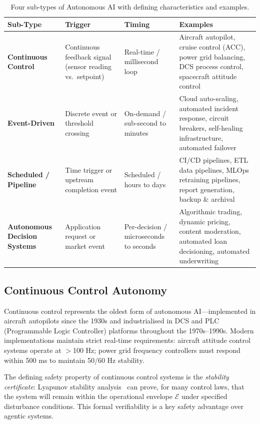 \documentclass[12pt, a4paper]{article}
\begin{document}
\begin{table}[ht]
\centering
\caption{Four sub-types of Autonomous AI with defining characteristics and examples.}
\label{tab:subtypes}
\begin{tabular}{lp{4cm}p{3.5cm}p{4cm}}
\toprule
\textbf{Sub-Type} & \textbf{Trigger} & \textbf{Timing} & \textbf{Examples} \\
\midrule
\textbf{Continuous Control}
  & Continuous feedback signal (sensor reading vs.\ setpoint)
  & Real-time / millisecond loop
  & Aircraft autopilot, cruise control (ACC), power grid balancing, DCS process control, spacecraft attitude control \\
\addlinespace
\textbf{Event-Driven}
  & Discrete event or threshold crossing
  & On-demand / sub-second to minutes
  & Cloud auto-scaling, automated incident response, circuit breakers, self-healing infrastructure, automated failover \\
\addlinespace
\textbf{Scheduled / Pipeline}
  & Time trigger or upstream completion event
  & Scheduled / hours to days
  & CI/CD pipelines, ETL data pipelines, MLOps retraining pipelines, report generation, backup \& archival \\
\addlinespace
\textbf{Autonomous Decision Systems}
  & Application request or market event
  & Per-decision / microseconds to seconds
  & Algorithmic trading, dynamic pricing, content moderation, automated loan decisioning, automated underwriting \\
\bottomrule
\end{tabular}
\end{table}

\subsection{Continuous Control Autonomy}
Continuous control represents the oldest form of autonomous AI---implemented in aircraft autopilots since the 1930s and industrialised in DCS and PLC (Programmable Logic Controller) platforms throughout the 1970s--1990s. Modern implementations maintain strict real-time requirements: aircraft attitude control systems operate at $>$100 Hz; power grid frequency controllers must respond within 500 ms to maintain 50/60 Hz stability.

The defining safety property of continuous control systems is the \emph{stability certificate}: Lyapunov stability analysis~\citep{lyapunov1892} can prove, for many control laws, that the system will remain within the operational envelope $\mathcal{E}$ under specified disturbance conditions. This formal verifiability is a key safety advantage over agentic systems.
\end{document}
